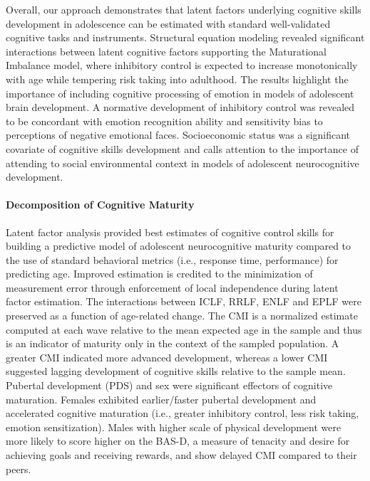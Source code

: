 \documentclass{article}%
\begin{document}
Overall, our approach demonstrates that latent factors underlying cognitive skills development in adolescence can be estimated with standard well-validated cognitive tasks and instruments. Structural equation modeling revealed significant interactions between latent cognitive factors supporting the Maturational Imbalance model, where inhibitory control is expected to increase monotonically with age while tempering risk taking into adulthood. The results highlight the importance of including cognitive processing of emotion in models of adolescent brain development. A normative development of inhibitory control was revealed to be concordant with emotion recognition ability and sensitivity bias to perceptions of negative emotional faces. Socioeconomic status was a significant covariate of cognitive skills development and calls attention to the importance of attending to social environmental context in models of adolescent neurocognitive development.
\vspace{2pt}
\paragraph*{Decomposition of Cognitive Maturity}
Latent factor analysis provided best estimates of cognitive control skills for building a predictive model of adolescent neurocognitive maturity compared to the use of standard behavioral metrics (i.e., response time, performance) for predicting age. Improved estimation is credited to the minimization of measurement error through enforcement of local independence during latent factor estimation. The interactions between ICLF, RRLF, ENLF and EPLF were preserved as a function of age-related change. The CMI is a normalized estimate computed at each wave relative to the mean expected age in the sample and thus is an indicator of maturity only in the context of the sampled population. A greater CMI indicated more advanced development, whereas a lower CMI suggested lagging development of cognitive skills relative to the sample mean. Pubertal development (PDS) and sex were significant effectors of cognitive maturation. Females exhibited earlier/faster pubertal development and accelerated cognitive maturation (i.e., greater inhibitory control, less risk taking, emotion sensitization). Males with higher scale of physical development were more likely to score higher on the BAS-D, a measure of tenacity and desire for achieving goals and receiving rewards, and show delayed CMI compared to their peers. 
\end{document}
